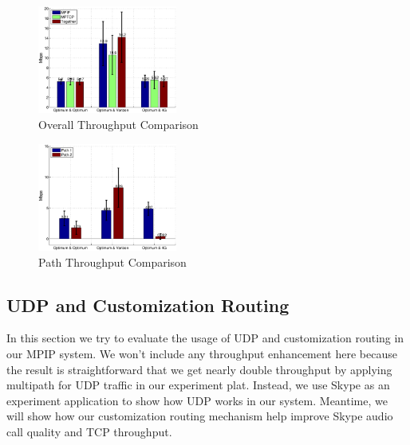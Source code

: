 \begin{figure}[H]
\centering
\includegraphics[width=0.8\linewidth,height=1.4in]{fig/emulab_tp_bar.eps}
\caption{Overall Throughput Comparison}
\label{fig.emulab_tp_bar}
\end{figure}


\begin{figure}[H]
\centering
\includegraphics[width=0.8\linewidth,height=1.4in]{fig/emulab_patp_bar.eps}
\caption{Path Throughput Comparison}
\label{fig.emulab_patp_bar}
\end{figure}




\subsection{UDP and Customization Routing}
\label{sec:udp}

In this section we try to evaluate the usage of UDP and customization routing in our MPIP system. We won't include any throughput enhancement here because the result is straightforward that we get nearly double throughput by applying multipath for UDP traffic in our experiment plat. Instead, we use Skype\cite{skype} as an experiment application to show how UDP works in our system. Meantime, we will show how our customization routing mechanism help improve Skype audio call quality and TCP throughput.

